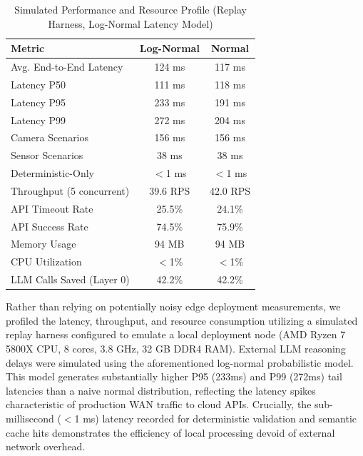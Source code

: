 \documentclass[
]{ceurart}
\begin{document}
\begin{table}[htbp]
    \centering
    \caption{Simulated Performance and Resource Profile (Replay Harness, Log-Normal Latency Model)}
    \label{tab:performance}
    \begin{tabular}{lcc}
        \toprule
        \textbf{Metric}                 & \textbf{Log-Normal} & \textbf{Normal} \\
        \midrule
        Avg. End-to-End Latency         & 124 ms    & 117 ms         \\
        \quad Latency P50               & 111 ms    & 118 ms         \\
        \quad Latency P95               & 233 ms    & 191 ms         \\
        \quad Latency P99               & 272 ms    & 204 ms         \\
        \quad Camera Scenarios          & 156 ms    & 156 ms         \\
        \quad Sensor Scenarios          & 38 ms     & 38 ms          \\
        \quad Deterministic-Only        & $<$1 ms   & $<$1 ms        \\
        Throughput (5 concurrent)       & 39.6 RPS  & 42.0 RPS       \\
        API Timeout Rate                & 25.5\%    & 24.1\%         \\
        API Success Rate                & 74.5\%    & 75.9\%         \\
        Memory Usage                    & 94 MB     & 94 MB          \\
        CPU Utilization                 & $<$1\%    & $<$1\%         \\
        LLM Calls Saved (Layer 0)       & 42.2\%    & 42.2\%         \\
        \bottomrule
    \end{tabular}
\end{table}

Rather than relying on potentially noisy edge deployment measurements, we profiled the latency, throughput, and resource consumption utilizing a simulated replay harness configured to emulate a local deployment node (AMD Ryzen 7 5800X CPU, 8 cores, 3.8 GHz, 32 GB DDR4 RAM). External LLM reasoning delays were simulated using the aforementioned log-normal probabilistic model. This model generates substantially higher P95 (233ms) and P99 (272ms) tail latencies than a naive normal distribution, reflecting the latency spikes characteristic of production WAN traffic to cloud APIs. Crucially, the sub-millisecond ($<$1 ms) latency recorded for deterministic validation and semantic cache hits demonstrates the efficiency of local processing devoid of external network overhead.
\end{document}
